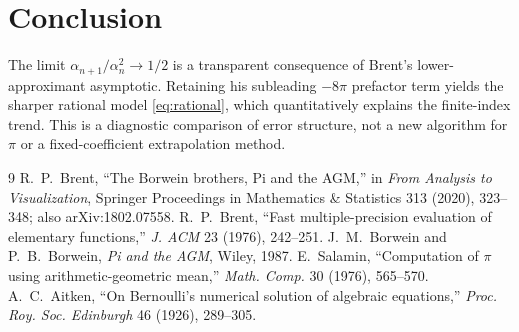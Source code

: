 \documentclass[11pt]{article}
\theoremstyle{definition}\newtheorem{remark}{Remark}\newtheorem{observation}{Numerical Observation}
\begin{document}
\section{Conclusion}
The limit $\alpha_{n+1}/\alpha_n^2\to1/2$ is a transparent consequence of Brent's lower-approximant asymptotic. Retaining his subleading $-8\pi$ prefactor term yields the sharper rational model \eqref{eq:rational}, which quantitatively explains the finite-index trend. This is a diagnostic comparison of error structure, not a new algorithm for $\pi$ or a fixed-coefficient extrapolation method.
\begin{thebibliography}{9}
 R.~P.~Brent, ``The Borwein brothers, Pi and the AGM,'' in \emph{From Analysis to Visualization}, Springer Proceedings in Mathematics \& Statistics 313 (2020), 323--348; also arXiv:1802.07558.
 R.~P.~Brent, ``Fast multiple-precision evaluation of elementary functions,'' \emph{J. ACM} 23 (1976), 242--251.
 J.~M.~Borwein and P.~B.~Borwein, \emph{Pi and the AGM}, Wiley, 1987.
 E.~Salamin, ``Computation of $\pi$ using arithmetic-geometric mean,'' \emph{Math. Comp.} 30 (1976), 565--570.
 A.~C.~Aitken, ``On Bernoulli's numerical solution of algebraic equations,'' \emph{Proc. Roy. Soc. Edinburgh} 46 (1926), 289--305.
\end{thebibliography}
\end{document}
